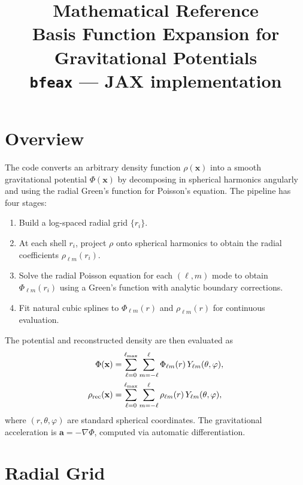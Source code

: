 \documentclass[11pt]{article}
\title{\textbf{Mathematical Reference}\\[0.5em]
  \large Basis Function Expansion for Gravitational Potentials\\[0.3em]
  \normalsize \texttt{bfeax} — JAX implementation}
\date{}
\begin{document}
\maketitle
\tableofcontents
\newpage

\section{Overview}

The code converts an arbitrary density function $\rho(\mathbf{x})$ into a
smooth gravitational potential $\Phi(\mathbf{x})$ by decomposing in spherical
harmonics angularly and using the radial Green's function for Poisson's
equation.  The pipeline has four stages:

\begin{enumerate}
  \item Build a log-spaced radial grid $\{r_i\}$.
  \item At each shell $r_i$, project $\rho$ onto spherical harmonics to obtain
        the radial coefficients $\rho_{\ell m}(r_i)$.
  \item Solve the radial Poisson equation for each $(\ell,m)$ mode to obtain
        $\Phi_{\ell m}(r_i)$ using a Green's function with analytic boundary
        corrections.
  \item Fit natural cubic splines to $\Phi_{\ell m}(r)$ and $\rho_{\ell m}(r)$
        for continuous evaluation.
\end{enumerate}

The potential and reconstructed density are then evaluated as
\begin{align}
  \Phi(\mathbf{x}) &= \sum_{\ell=0}^{\ell_{\max}} \sum_{m=-\ell}^{\ell}
    \Phi_{\ell m}(r)\, Y_{\ell m}(\theta,\varphi), \\
  \rho_{\rm rec}(\mathbf{x}) &= \sum_{\ell=0}^{\ell_{\max}} \sum_{m=-\ell}^{\ell}
    \rho_{\ell m}(r)\, Y_{\ell m}(\theta,\varphi),
\end{align}
where $(r,\theta,\varphi)$ are standard spherical coordinates.  The
gravitational acceleration is $\mathbf{a} = -\nabla\Phi$, computed via
automatic differentiation.

\section{Radial Grid}
\end{document}
